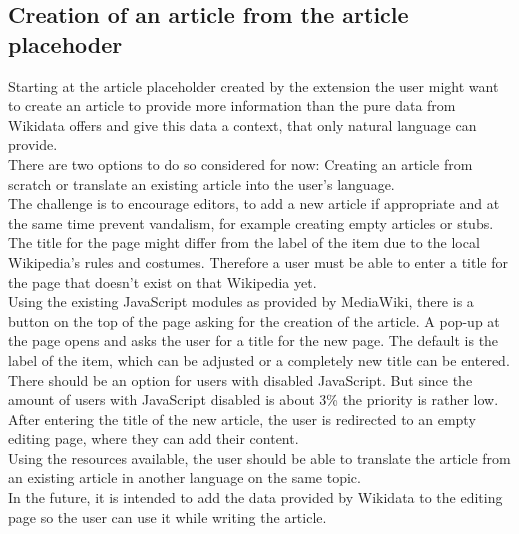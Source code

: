 \subsection{Creation of an article from the article placehoder}
Starting at the article placeholder created by the extension the user might want to create an article to provide more information than the pure data from Wikidata offers and give this data a context, that only natural language can provide. \\
There are two options to do so considered for now: Creating an article from scratch or translate an existing article into the user's language. \\
The challenge is to encourage editors, to add a new article if appropriate and at the same time prevent vandalism, for example creating empty articles or stubs.\\ 
 The title for the page might differ from the label of the item due to the local Wikipedia's rules and costumes. Therefore a user must be able to enter a title for the page that doesn't exist on that Wikipedia yet. \\
Using the existing JavaScript modules as provided by MediaWiki, there is a button on the top of the page asking for the creation of the article. A pop-up at the page opens and asks the user for a title for the new page. The default is the label of the item, which can be adjusted or a completely new title can be entered. \\
There should be an option for users with disabled JavaScript. But since the amount of users with JavaScript disabled is about 3\% %
the priority is rather low. \\
After entering the title of the new article, the user is redirected to an empty editing page, where they can add their content. \\
Using the resources  available, the user should be able to translate the article from an existing article in another language on the same topic. \\
In the future, it is intended to add the data provided by Wikidata to the editing page so the user can use it while writing the article. 

